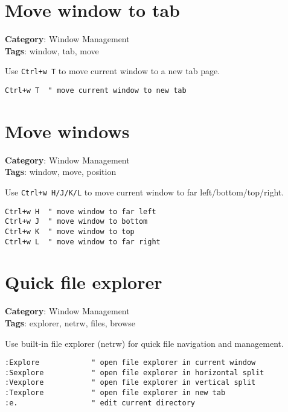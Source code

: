 {{{{{{{{{{{{{{{{{{\section{Move window to tab}

\textbf{Category}: Window Management\\ \textbf{Tags}: window, tab, move
\vspace{0.5cm}

Use {\footnotesize \Verb§Ctrl+w T§} to move current window to a new tab page.

\begin{Exa*}{}
\begin{Verbatim}[fontsize=\footnotesize, breaklines, breakanywhere]
Ctrl+w T  " move current window to new tab
\end{Verbatim}
\end{Exa*}

\section{Move windows}

\textbf{Category}: Window Management\\ \textbf{Tags}: window, move, position
\vspace{0.5cm}

Use {\footnotesize \Verb§Ctrl+w H/J/K/L§} to move current window to far left/bottom/top/right.

\begin{Exa*}{}
\begin{Verbatim}[fontsize=\footnotesize, breaklines, breakanywhere]
Ctrl+w H  " move window to far left
Ctrl+w J  " move window to bottom
Ctrl+w K  " move window to top  
Ctrl+w L  " move window to far right
\end{Verbatim}
\end{Exa*}

\section{Quick file explorer}

\textbf{Category}: Window Management\\ \textbf{Tags}: explorer, netrw, files, browse
\vspace{0.5cm}

Use built-in file explorer (netrw) for quick file navigation and management.

\begin{Exa*}{}
\begin{Verbatim}[fontsize=\footnotesize, breaklines, breakanywhere]
:Explore            " open file explorer in current window
:Sexplore           " open file explorer in horizontal split
:Vexplore           " open file explorer in vertical split
:Texplore           " open file explorer in new tab
:e.                 " edit current directory


\end{Verbatim}
\end{Exa*}}}}}}}}}}}}}}}}}}}
